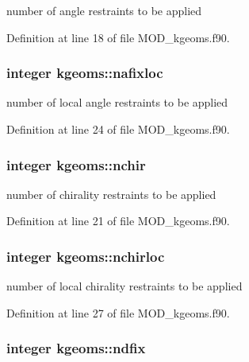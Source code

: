 number of angle restraints to be applied 



Definition at line 18 of file M\-O\-D\-\_\-kgeoms.\-f90.

\hypertarget{classkgeoms_a506676025df9a1087d5380bfa10f7b79}{
\subsubsection[{nafixloc}]{\setlength{\rightskip}{0pt plus 5cm}integer kgeoms\-::nafixloc}}\label{classkgeoms_a506676025df9a1087d5380bfa10f7b79}


number of local angle restraints to be applied 



Definition at line 24 of file M\-O\-D\-\_\-kgeoms.\-f90.

\hypertarget{classkgeoms_a9192b7f33e91b89220617d2010ec3c4c}{
\subsubsection[{nchir}]{\setlength{\rightskip}{0pt plus 5cm}integer kgeoms\-::nchir}}\label{classkgeoms_a9192b7f33e91b89220617d2010ec3c4c}


number of chirality restraints to be applied 



Definition at line 21 of file M\-O\-D\-\_\-kgeoms.\-f90.

\hypertarget{classkgeoms_a8c919c07a701205fa46340965d23f450}{
\subsubsection[{nchirloc}]{\setlength{\rightskip}{0pt plus 5cm}integer kgeoms\-::nchirloc}}\label{classkgeoms_a8c919c07a701205fa46340965d23f450}


number of local chirality restraints to be applied 



Definition at line 27 of file M\-O\-D\-\_\-kgeoms.\-f90.

\hypertarget{classkgeoms_a85ef2631e17c98ffe2a73fe6b6747a59}{
\subsubsection[{ndfix}]{\setlength{\rightskip}{0pt plus 5cm}integer kgeoms\-::ndfix}}\label{classkgeoms_a85ef2631e17c98ffe2a73fe6b6747a59}


